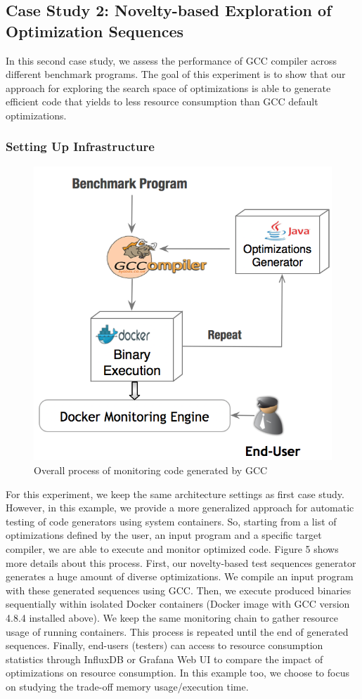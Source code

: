 \subsection{Case Study 2: Novelty-based Exploration of Optimization Sequences}
In this second case study, we assess the performance of GCC compiler across different benchmark programs. The goal of this experiment is to show that our approach for exploring the search space of optimizations is able to generate efficient code that yields to less resource consumption than GCC default optimizations.
\subsubsection{Setting Up Infrastructure}
\begin{figure}[h]
	\centering
	\includegraphics[scale=0.50]{Ressources/infra_novelty.png}
	\caption{Overall process of monitoring code generated by GCC}
\end{figure}
For this experiment, we keep the same architecture settings as first case study. However, in this example, we provide a more generalized approach for automatic testing of code generators using system containers. So, starting from a list of optimizations defined by the user, an input program and a specific target compiler, we are able to execute and monitor optimized code. Figure 5 shows more details about this process. First, our novelty-based test sequences generator generates a huge amount of diverse optimizations. We compile an input program with these generated sequences using GCC. Then, we execute produced binaries sequentially within isolated Docker containers (Docker image with GCC version 4.8.4 installed above). We keep the same monitoring chain to gather resource usage of running containers. This process is repeated until the end of generated sequences. Finally, end-users (testers) can access to resource consumption statistics through InfluxDB or Grafana Web UI to compare the impact of optimizations on resource consumption. In this example too, we choose to focus on studying the trade-off memory usage/execution time. 
